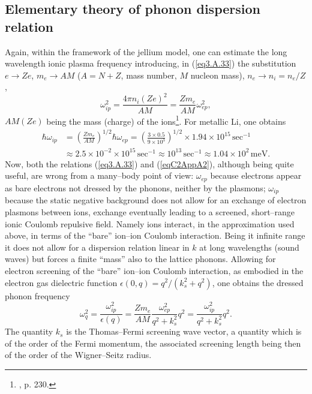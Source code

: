 \begin{subappendices}
\subsection{Elementary theory of phonon dispersion relation}
Again, within the framework of the jellium model, one can estimate the long wavelength ionic plasma frequency introducing, in (\ref{eq3.A.33})  the substitution $e\rightarrow Ze$, $m_e\rightarrow AM$ ($A=N+Z$, mass number, $M$ nucleon mass), $n_e\rightarrow n_i=n_e/Z$,
\begin{equation}\label{eqC2AppA2}
\omega_{ip}^2=\frac{4\pi n_i(Ze)^2}{AM}=\frac{Zm_e}{AM}\omega_{ep}^2,
\end{equation}
$AM (Ze)$ being the mass (charge) of the ions\footnote{\cite{Ketterson:99}, p. 230.}.
For metallic Li, one obtains
\begin{align}
\nonumber\hbar\omega_{ip}&=\left(\frac{Zm_e}{AM}\right)^{1/2}\hbar\omega_{ep}=\left(\frac{3\times0.5}{9\times10^3}\right)^{1/2}\times1.94\times 10^{15}\,\text{sec}^{-1}\\
&\approx2.5\times 10^{-2}\times10^{15}\,\text{sec}^{-1}\approx10^{13}\,\text{sec}^{-1}\approx1.04\times10^2\,\text{meV}.
\end{align}
Now, both  the  relations (\ref{eq3.A.33}) and (\ref{eqC2AppA2}), although being quite useful, are wrong from a many--body point of view: $\omega_{ep}$ because electrons appear as bare electrons not dressed by the phonons, neither by the plasmons; $\omega_{ip}$ because the  static negative background does not allow for an exchange of electron plasmons between ions, exchange eventually leading to a screened, short--range ionic Coulomb repulsive field. Namely ions interact, in the approximation used above, in terms of the ``bare'' ion--ion Coulomb interaction. Being it infinite range it does not allow for a dispersion relation linear in $k$ at long wavelengths (sound waves) but forces a finite ``mass'' also to the lattice phonons. Allowing for electron screening of the ``bare'' ion--ion Coulomb interaction, as embodied in the electron gas dielectric function $\epsilon(0,q)=q^2/(k_s^2+q^2)$, one obtains the dressed phonon frequency
\begin{equation}\label{eqC2AppA3}
\omega_q^2=\frac{\omega_{ip}^2}{\epsilon(q)}=\frac{Zm_e}{AM}\frac{\omega_{ep}^2}{q^2+k_s^2}q^2=\frac{\omega_{ip}^2}{q^2+k_s^2}q^2.
\end{equation}
The quantity $k_s$ is the Thomas--Fermi screening wave vector, a quantity which is of the order of the Fermi momentum, the associated screening length being then of the order of the Wigner--Seitz radius.

\end{subappendices}
